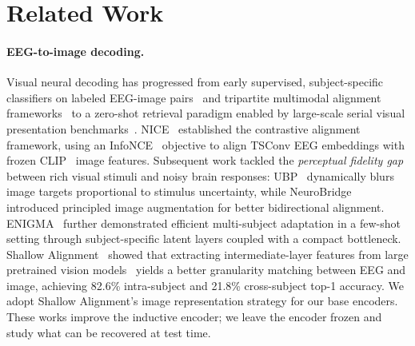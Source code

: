 \documentclass[10pt,twocolumn,letterpaper]{article}
\begin{document}
\section{Related Work}
\label{sec:related}

\paragraph{EEG-to-image decoding.}
Visual neural decoding has progressed from early supervised, subject-specific classifiers on labeled EEG-image pairs~\cite{spampinato2017deep} and tripartite multimodal alignment frameworks~\cite{du2023bravl} to a zero-shot retrieval paradigm enabled by large-scale serial visual presentation benchmarks~\cite{gifford2022things,grootswagers2022things}.
NICE~\cite{song2024nice} established the contrastive alignment framework, using an InfoNCE~\cite{oord2019cpc} objective to align TSConv EEG embeddings with frozen CLIP~\cite{radford2021clip} image features.
Subsequent work tackled the \emph{perceptual fidelity gap} between rich visual stimuli and noisy brain responses: UBP~\cite{wu2025ubp} dynamically blurs image targets proportional to stimulus uncertainty, while NeuroBridge~\cite{zhang2025neurobridge} introduced principled image augmentation for better bidirectional alignment.
ENIGMA~\cite{kneeland2025enigma} further demonstrated efficient multi-subject adaptation in a few-shot setting through subject-specific latent layers coupled with a compact bottleneck.
Shallow Alignment~\cite{du2025shallow} showed that extracting intermediate-layer features from large pretrained vision models~\cite{chen2024internvl} yields a better granularity matching between EEG and image, achieving 82.6\% intra-subject and 21.8\% cross-subject top-1 accuracy.
We adopt Shallow Alignment's image representation strategy for our base encoders. These works improve the inductive encoder; we leave the encoder frozen and study what can be recovered at test time.
\end{document}
